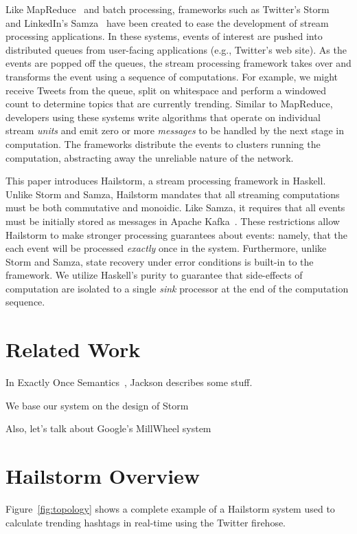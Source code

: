 \documentclass[10pt,nocopyrightspace]{sigplanconf}
\begin{document}
Like MapReduce~\cite{mapreduce} and batch processing, frameworks such as Twitter's 
Storm~\cite{storm} and LinkedIn's Samza~\cite{samza} have been created to ease 
the development of stream processing applications. In these systems, events of interest are 
pushed into distributed queues from user-facing applications (e.g., Twitter's web site).
As the events are popped off the queues, the stream processing framework takes
over and transforms the event using a sequence of computations. For example,
we might receive Tweets from the queue, split on whitespace and perform a windowed
count to determine topics that are currently trending. Similar to MapReduce, 
developers using these systems write algorithms that operate on individual 
stream \textit{units} and emit zero or more \textit{messages} to be handled by the next
stage in computation. The frameworks distribute the events
to clusters running the computation, abstracting away the 
unreliable nature of the network.

This paper introduces Hailstorm, a stream processing framework in Haskell. 
Unlike Storm and Samza, Hailstorm mandates that all streaming computations
must be both commutative and monoidic. Like Samza, it requires that all
events must be initially stored as messages in Apache Kafka~\cite{kafka}.
These restrictions allow Hailstorm to make stronger processing guarantees
about events: namely, that the each event will be processed \textit{exactly}
once in the system. Furthermore, unlike Storm and Samza, state recovery under
error conditions is built-in to the framework. We utilize Haskell's purity
to guarantee that side-effects of computation are isolated to a single
\textit{sink} processor at the end of the computation sequence.


\section{Related Work}
In Exactly Once Semantics~\cite{jackson2014}, Jackson describes some stuff.

We base our system on the design of Storm~\cite{storm}

Also, let's talk about Google's MillWheel system~\cite{millwheel}


\section{Hailstorm Overview}
Figure~\ref{fig:topology} shows a complete example of a Hailstorm system 
used to calculate trending hashtags in real-time using the Twitter firehose.
\end{document}
